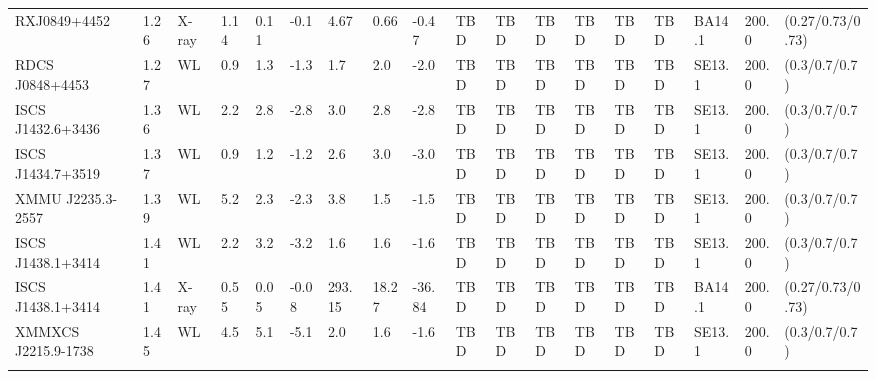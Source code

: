 \documentclass{article}
\begin{document}
\begin{center}
\begin{landscape}
\begin{longtable}{llllllllllllllllll}
RXJ0849+4452 & 1.26 & X-ray & 1.14 & 0.11 & -0.1 & 4.67 & 0.66 & -0.47 & TBD & TBD & TBD & TBD & TBD & TBD & BA14.1 & 200.0 & (0.27/0.73/0.73) \\
RDCS J0848+4453 & 1.27 & WL & 0.9 & 1.3 & -1.3 & 1.7 & 2.0 & -2.0 & TBD & TBD & TBD & TBD & TBD & TBD & SE13.1 & 200.0 & (0.3/0.7/0.7) \\
ISCS J1432.6+3436 & 1.36 & WL & 2.2 & 2.8 & -2.8 & 3.0 & 2.8 & -2.8 & TBD & TBD & TBD & TBD & TBD & TBD & SE13.1 & 200.0 & (0.3/0.7/0.7) \\
ISCS J1434.7+3519 & 1.37 & WL & 0.9 & 1.2 & -1.2 & 2.6 & 3.0 & -3.0 & TBD & TBD & TBD & TBD & TBD & TBD & SE13.1 & 200.0 & (0.3/0.7/0.7) \\
XMMU J2235.3-2557 & 1.39 & WL & 5.2 & 2.3 & -2.3 & 3.8 & 1.5 & -1.5 & TBD & TBD & TBD & TBD & TBD & TBD & SE13.1 & 200.0 & (0.3/0.7/0.7) \\
ISCS J1438.1+3414 & 1.41 & WL & 2.2 & 3.2 & -3.2 & 1.6 & 1.6 & -1.6 & TBD & TBD & TBD & TBD & TBD & TBD & SE13.1 & 200.0 & (0.3/0.7/0.7) \\
ISCS J1438.1+3414 & 1.41 & X-ray & 0.55 & 0.05 & -0.08 & 293.15 & 18.27 & -36.84 & TBD & TBD & TBD & TBD & TBD & TBD & BA14.1 & 200.0 & (0.27/0.73/0.73) \\
XMMXCS J2215.9-1738 & 1.45 & WL & 4.5 & 5.1 & -5.1 & 2.0 & 1.6 & -1.6 & TBD & TBD & TBD & TBD & TBD & TBD & SE13.1 & 200.0 & (0.3/0.7/0.7) \\
\label{tbl-1}
\end{longtable}
\end{landscape}
\end{center}
\end{document}
